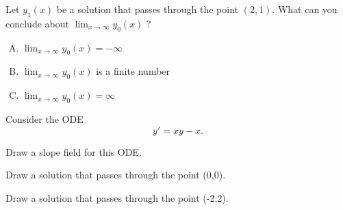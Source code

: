 \begin{applicationActivities}
\begin{definition}
\end{definition}

\begin{activity}{5}
\begin{center}\end{center}

Let \(y_1(x)\) be a solution that passes through the point \( (2,1) \).  What can you conclude about \( \lim _{x \rightarrow \infty} y_0(x) \) ?
\begin{enumerate}[(A)]
\item \( \lim _{x \rightarrow \infty} y_0(x) = -\infty \) 
\item \( \lim _{x \rightarrow \infty} y_0(x) \) is a finite number
\item \( \lim _{x \rightarrow \infty} y_0(x) = \infty \) 
\end{enumerate}

\end{activity}

\begin{activity}{15}
Consider the ODE \[y'=xy-x.\]
\begin{subactivity}
Draw a slope field for this ODE.
\end{subactivity}
\begin{subactivity}
Draw a solution that passes through the point (0,0).
\end{subactivity}
\begin{subactivity}
Draw a solution that passes through the point (-2,2).
\end{subactivity}
\end{activity}


\end{applicationActivities}
